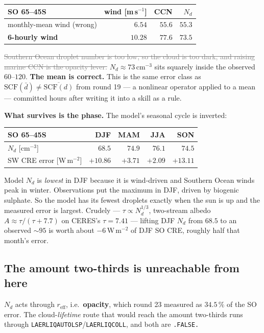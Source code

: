\documentclass[10pt]{article}
\newcommand{\dead}[1]{\textcolor{gray}{\sout{#1}}}
\begin{document}
\begin{center}\footnotesize
\begin{tabular}{l r r r}
\toprule
SO 65--45S & wind [m\,s$^{-1}$] & CCN & $N_d$ \\
\midrule
monthly-mean wind (wrong) & $6.54$ & $55.6$ & $55.3$ \\
\textbf{6-hourly wind} & $\mathbf{10.28}$ & $\mathbf{77.6}$ & $\mathbf{73.5}$ \\
\bottomrule
\end{tabular}
\end{center}

\dead{Southern Ocean droplet number is too low, so the cloud is too dark, and raising
marine CCN is the opacity lever.} $N_d\approx73$\,cm$^{-3}$ sits squarely inside the
observed $60$--$120$. \textbf{The mean is correct.} This is the same error class as
$\mathrm{SCF}(\bar d)\neq\overline{\mathrm{SCF}(d)}$ from round 19 --- a nonlinear
operator applied to a mean --- committed hours after writing it into a skill as a rule.

\textbf{What survives is the phase.} The model's seasonal cycle is inverted:

\begin{center}\footnotesize
\begin{tabular}{l r r r r}
\toprule
SO 65--45S & DJF & MAM & JJA & SON \\
\midrule
$N_d$ [cm$^{-3}$] & $\mathbf{68.5}$ & $74.9$ & $\mathbf{76.1}$ & $74.5$ \\
SW CRE error [W\,m$^{-2}$] & $\mathbf{+10.86}$ & $+3.71$ & $+2.09$ & $\mathbf{+13.11}$ \\
\bottomrule
\end{tabular}
\end{center}

\noindent Model $N_d$ is \emph{lowest} in DJF because it is wind-driven and Southern Ocean
winds peak in winter. Observations put the maximum in DJF, driven by biogenic sulphate. So
the model has its fewest droplets exactly when the sun is up and the measured error is
largest. Crudely --- $\tau\propto N_d^{1/3}$, two-stream albedo $A\approx\tau/(\tau+7.7)$
on CERES's $\tau=7.41$ --- lifting DJF $N_d$ from $68.5$ to an observed ${\sim}95$ is worth
about $-6$\,W\,m$^{-2}$ of DJF SO CRE, roughly half that month's error.

\subsection{The amount two-thirds is unreachable from here}\label{sub:r24amount}
$N_d$ acts through $r_{\text{eff}}$, i.e.\ \textbf{opacity}, which round 23 measured as
$34.5\,\%$ of the SO error. The cloud-\emph{lifetime} route that would reach the amount
two-thirds runs through \texttt{LAERLIQAUTOLSP}/\texttt{LAERLIQCOLL}, and both are
\texttt{.FALSE.}
\end{document}
